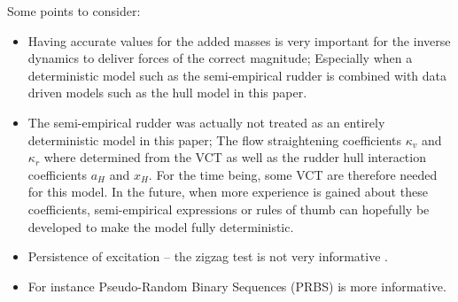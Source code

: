 Some points to consider:
\begin{itemize}
    \item Having accurate values for the added masses is very important for the inverse dynamics to deliver forces of the correct magnitude; Especially when a deterministic model such as the semi-empirical rudder is combined with data driven models such as the hull model in this paper. 
    \item The semi-empirical rudder was actually not treated as an entirely deterministic model in this paper; The flow straightening coefficients $\kappa_v$ and $\kappa_r$ where determined from the VCT as well as the rudder hull interaction coefficients $a_H$ and $x_H$. For the time being, some VCT are therefore needed for this model. In the future, when more experience is gained about these coefficients, semi-empirical expressions or rules of thumb can hopefully be developed to make the model fully deterministic.
    \item Persistence of excitation -- the zigzag test is not very informative \citep{sutulo_algorithm_2014}.
    \item For instance Pseudo-Random Binary Sequences (PRBS) \citep{landau_digital_2006} is more informative.
\end{itemize}